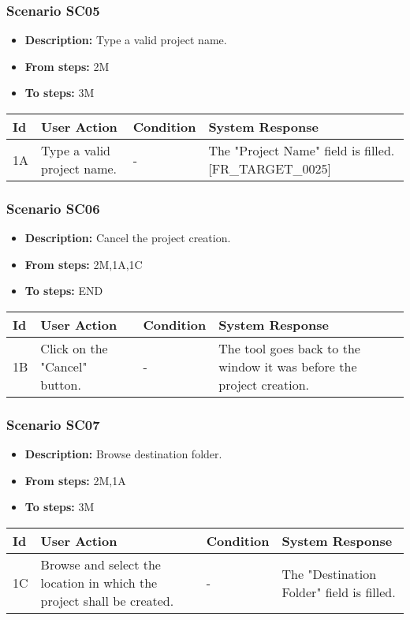 \documentclass[a4paper,11pt]{article}
\newcommand{\bl}{\\ \hline}
\begin{document}
\subsubsection*{Scenario SC05}
\begin{itemize}
\item {\bf Description:} Type a valid project name.
\item {\bf From steps:} 2M
\item {\bf To steps:} 3M
\end{itemize}
\begin{tabular}{|p{0.4in}|p{1.5in}|p{1.5in}|p{1.5in}|}
\hline
Id & User Action & Condition & System Response \bl 
1A & Type a valid project name. & - & The "Project Name" field is filled. [FR_TARGET_0025]
					\bl
\end{tabular}
\subsubsection*{Scenario SC06}
\begin{itemize}
\item {\bf Description:} Cancel the project creation.
\item {\bf From steps:} 2M,1A,1C
\item {\bf To steps:} END
\end{itemize}
\begin{tabular}{|p{0.4in}|p{1.5in}|p{1.5in}|p{1.5in}|}
\hline
Id & User Action & Condition & System Response \bl 
1B & Click on the "Cancel" button. & - & The tool goes back to the window it was before the
						project creation.\bl
\end{tabular}
\subsubsection*{Scenario SC07}
\begin{itemize}
\item {\bf Description:} Browse destination folder.
\item {\bf From steps:} 2M,1A
\item {\bf To steps:} 3M
\end{itemize}
\begin{tabular}{|p{0.4in}|p{1.5in}|p{1.5in}|p{1.5in}|}
\hline
Id & User Action & Condition & System Response \bl 
1C & Browse and select the location in which the project shall
						be created. & - & The "Destination Folder" field is filled.\bl
\end{tabular}
\end{document}
